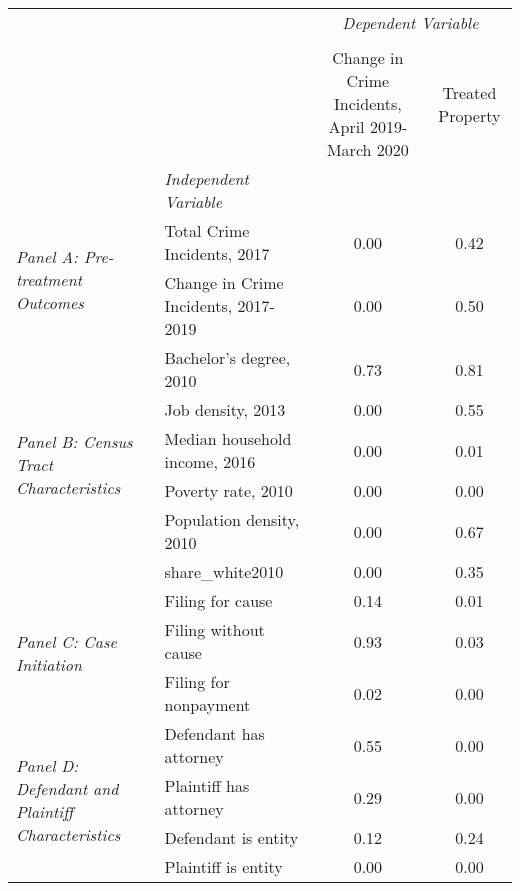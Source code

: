 \begin{tabular}{llcc}
\toprule
 &  & \multicolumn{2}{c}{\textit{Dependent Variable}} \\
\cline{3-4}
\\
 &  & Change in Crime Incidents, April 2019-March 2020 & Treated Property \\
 & \emph{Independent Variable} &  &  \\
\midrule
\multirow[c]{2}{3cm}{\textit{Panel A: Pre-treatment Outcomes}} & Total Crime Incidents, 2017 & 0.00 & 0.42 \\
 & Change in Crime Incidents, 2017-2019 & 0.00 & 0.50 \\
\cline{1-4}
\multirow[c]{6}{3cm}{\textit{Panel B: Census Tract Characteristics}} & Bachelor's degree, 2010 & 0.73 & 0.81 \\
 & Job density, 2013 & 0.00 & 0.55 \\
 & Median household income, 2016 & 0.00 & 0.01 \\
 & Poverty rate, 2010 & 0.00 & 0.00 \\
 & Population density, 2010 & 0.00 & 0.67 \\
 & share_white2010 & 0.00 & 0.35 \\
\cline{1-4}
\multirow[c]{3}{3cm}{\textit{Panel C: Case Initiation}} & Filing for cause & 0.14 & 0.01 \\
 & Filing without cause & 0.93 & 0.03 \\
 & Filing for nonpayment & 0.02 & 0.00 \\
\cline{1-4}
\multirow[c]{4}{3cm}{\textit{Panel D: Defendant and Plaintiff Characteristics}} & Defendant has attorney & 0.55 & 0.00 \\
 & Plaintiff has attorney & 0.29 & 0.00 \\
 & Defendant is entity & 0.12 & 0.24 \\
 & Plaintiff is entity & 0.00 & 0.00 \\
\cline{1-4}
\bottomrule
\end{tabular}
